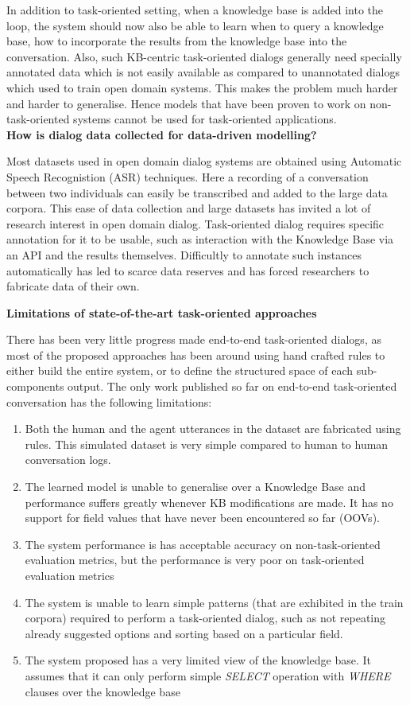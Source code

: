 In addition to task-oriented setting, when a knowledge base is added into the loop, the system should now also be able to learn when to query a knowledge base, how to incorporate the results from the knowledge base into the conversation. Also, such KB-centric task-oriented dialogs generally need specially annotated data which is not easily available as compared to unannotated dialogs which used to train open domain systems. This makes the problem much harder and harder to generalise. Hence models that have been proven to work on non-task-oriented systems cannot be used for task-oriented applications.\\

\noindent \textbf{How is dialog data collected for data-driven modelling?}

Most datasets used in open domain dialog systems are obtained using Automatic Speech Recognistion (ASR) techniques. Here a recording of a conversation between two individuals can easily be transcribed and added to the large data corpora. This ease of data collection and large datasets has invited a lot of research interest in open domain dialog. Task-oriented dialog requires specific annotation for it to be usable, such as interaction with the Knowledge Base via an API and the results themselves. Difficultly to annotate such instances automatically has led to scarce data reserves and has forced researchers to fabricate data of their own.

\noindent \textbf{Limitations of state-of-the-art task-oriented approaches}

There has been very little progress made end-to-end task-oriented dialogs, as most of the proposed approaches has been around using hand crafted rules to either build the entire system, or to define the structured space of each sub-components output. The only work published so far on end-to-end task-oriented conversation has the following limitations:
\begin{enumerate}
\item Both the human and the agent utterances in the dataset are fabricated using rules. This simulated dataset is very simple compared to human to human conversation logs.
\item The learned model is unable to generalise over a Knowledge Base and performance suffers greatly whenever KB modifications are made. It has no support for field values that have never been encountered so far (OOVs).
\item The system performance is has acceptable accuracy on non-task-oriented evaluation metrics, but the performance is very poor on task-oriented evaluation metrics
\item The system is unable to learn simple patterns (that are exhibited in the train corpora) required to perform a task-oriented dialog, such as not repeating already suggested options and sorting based on a particular field.
\item The system proposed has a very limited view of the knowledge base. It assumes that it can only perform simple {\em SELECT} operation with {\em WHERE} clauses over the knowledge base
\end{enumerate} 

